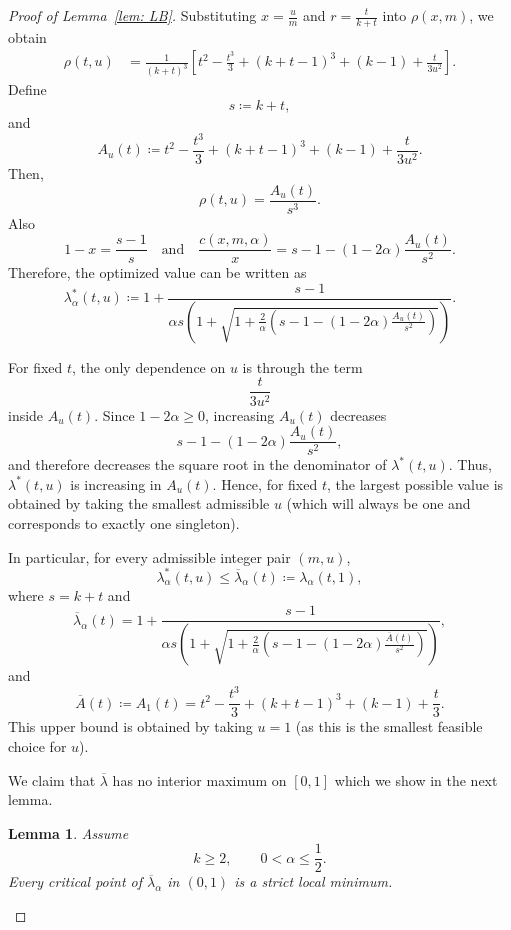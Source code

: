 \documentclass[%
english, titlepage=false %
]{./tum-templates/book/tumbook}
\newtheorem{lemma}{Lemma}
\begin{document}
\begin{proof}[\hypertarget{proof:LB}{Proof of Lemma~\ref{lem: LB}}]
Substituting $x=\frac{u}{m}$ and $r=\frac{t}{k+t}$ into \(\rho(x,m)\), we obtain 
\[
\begin{aligned}
\rho(t,u)
&=
\frac{1}{(k+t)^3}
\left[
t^2-\frac{t^3}{3}
 +(k+t-1)^3
 +(k-1)
 +\frac{t}{3u^2}
\right].
\end{aligned}
\]
Define
\[
        s\coloneqq k+t,
\]
and
\[
        A_u(t)
        \coloneqq
        t^2-\frac{t^3}{3}
        +(k+t-1)^3
        +(k-1)
        +\frac{t}{3u^2}.
\]
Then,
\[
        \rho(t,u)=\frac{A_u(t)}{s^3}.
\]
Also
\[
        1-x=\frac{s-1}{s} \quad \text{and}
        \quad
        \frac{c(x,m,\alpha)}{x}
        =
        s-1-(1-2\alpha)\frac{A_u(t)}{s^2}.
\]
Therefore, the optimized value can be written as
\[
        \lambda_{\alpha}^*(t,u)
        \coloneqq
        1+
        \frac{s-1}{
        \alpha s\left(
        1+\sqrt{
        1+\frac{2}{\alpha}
        \left(
        s-1-(1-2\alpha)\frac{A_u(t)}{s^2}
        \right)
        }
        \right)
        }.
\]

For fixed \(t\), the only dependence on \(u\) is through the term
\[
        \frac{t}{3u^2}
\]
inside \(A_u(t)\). Since \(1-2\alpha\geq 0\), increasing \(A_u(t)\) decreases
\[
        s-1-(1-2\alpha)\frac{A_u(t)}{s^2},
\]
and therefore decreases the square root in the denominator of \(\lambda^*(t,u)\).
Thus, \(\lambda^*(t,u)\) is increasing in \(A_u(t)\). Hence, for fixed \(t\),
the largest possible value is obtained by taking the smallest admissible
\(u\) (which will always be one and corresponds to exactly one singleton).

In particular, for every admissible integer pair \((m,u)\),
\[
        \lambda_{\alpha}^*(t,u)\leq \overline \lambda_{\alpha}(t) \coloneqq \lambda_{\alpha}(t,1),
\]
where \(s=k+t\) and
\[
        \overline \lambda_{\alpha}(t)
        =
        1+
        \frac{s-1}{
        \alpha s\left(
        1+\sqrt{
        1+\frac{2}{\alpha}
        \left(
        s-1-(1-2\alpha)\frac{\overline A(t)}{s^2}
        \right)
        }
        \right)
        },
\]
and
\[
        \overline A(t) \coloneqq A_1(t)
        =
        t^2-\frac{t^3}{3}
        +(k+t-1)^3
        +(k-1)
        +\frac{t}{3}.
\]
This upper bound is obtained by taking \(u=1\) (as this is the smallest feasible choice for $u$).

We claim that \(\overline \lambda\) has no interior maximum on \([0,1]\) which we show in the next lemma.

\begin{lemma}
Assume
\[
        k\geq 2,\qquad 0<\alpha\leq \frac12.
\]
Every critical point of \(\overline \lambda_{\alpha}\) in \((0,1)\) is a strict local
minimum.
\end{lemma}


\end{proof}
\end{document}
